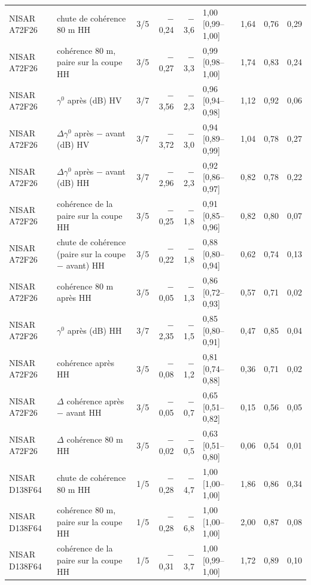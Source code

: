\begin{table}[htbp]
\begin{tabular}{llcrrlrrr}
\addlinespace
NISAR A72F26 & chute de cohérence 80 m HH & 3/5 & $-$0{,}24 & $-$3{,}6 & 1{,}00 [0{,}99--1{,}00] & 1{,}64 & 0{,}76 & 0{,}29 \\
NISAR A72F26 & cohérence 80 m, paire sur la coupe HH & 3/5 & $-$0{,}27 & $-$3{,}3 & 0{,}99 [0{,}98--1{,}00] & 1{,}74 & 0{,}83 & 0{,}24 \\
NISAR A72F26 & $\gamma^0$ après (dB) HV & 3/7 & $-$3{,}56 & $-$2{,}3 & 0{,}96 [0{,}94--0{,}98] & 1{,}12 & 0{,}92 & 0{,}06 \\
NISAR A72F26 & $\Delta\gamma^0$ après $-$ avant (dB) HV & 3/7 & $-$3{,}72 & $-$3{,}0 & 0{,}94 [0{,}89--0{,}99] & 1{,}04 & 0{,}78 & 0{,}27 \\
NISAR A72F26 & $\Delta\gamma^0$ après $-$ avant (dB) HH & 3/7 & $-$2{,}96 & $-$2{,}3 & 0{,}92 [0{,}86--0{,}97] & 0{,}82 & 0{,}78 & 0{,}22 \\
NISAR A72F26 & cohérence de la paire sur la coupe HH & 3/5 & $-$0{,}25 & $-$1{,}8 & 0{,}91 [0{,}85--0{,}96] & 0{,}82 & 0{,}80 & 0{,}07 \\
NISAR A72F26 & chute de cohérence (paire sur la coupe $-$ avant) HH & 3/5 & $-$0{,}22 & $-$1{,}8 & 0{,}88 [0{,}80--0{,}94] & 0{,}62 & 0{,}74 & 0{,}13 \\
NISAR A72F26 & cohérence 80 m après HH & 3/5 & $-$0{,}05 & $-$1{,}3 & 0{,}86 [0{,}72--0{,}93] & 0{,}57 & 0{,}71 & 0{,}02 \\
NISAR A72F26 & $\gamma^0$ après (dB) HH & 3/7 & $-$2{,}35 & $-$1{,}5 & 0{,}85 [0{,}80--0{,}91] & 0{,}47 & 0{,}85 & 0{,}04 \\
NISAR A72F26 & cohérence après HH & 3/5 & $-$0{,}08 & $-$1{,}2 & 0{,}81 [0{,}74--0{,}88] & 0{,}36 & 0{,}71 & 0{,}02 \\
NISAR A72F26 & $\Delta$ cohérence après $-$ avant HH & 3/5 & $-$0{,}05 & $-$0{,}7 & 0{,}65 [0{,}51--0{,}82] & 0{,}15 & 0{,}56 & 0{,}05 \\
NISAR A72F26 & $\Delta$ cohérence 80 m HH & 3/5 & $-$0{,}02 & $-$0{,}5 & 0{,}63 [0{,}51--0{,}80] & 0{,}06 & 0{,}54 & 0{,}01 \\
\addlinespace
NISAR D138F64 & chute de cohérence 80 m HH & 1/5 & $-$0{,}28 & $-$4{,}7 & 1{,}00 [1{,}00--1{,}00] & 1{,}86 & 0{,}86 & 0{,}34 \\
NISAR D138F64 & cohérence 80 m, paire sur la coupe HH & 1/5 & $-$0{,}28 & $-$6{,}8 & 1{,}00 [1{,}00--1{,}00] & 2{,}00 & 0{,}87 & 0{,}08 \\
NISAR D138F64 & cohérence de la paire sur la coupe HH & 1/5 & $-$0{,}31 & $-$3{,}7 & 1{,}00 [0{,}99--1{,}00] & 1{,}72 & 0{,}89 & 0{,}10 \\

\end{tabular}
\end{table}
